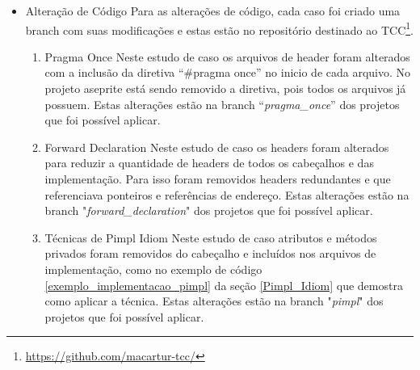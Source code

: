 \begin{itemize}
    \item Alteração de Código
    \subitem
 Para as alterações de código, cada caso foi criado
 uma branch com suas modificações e estas estão no repositório
 destinado ao TCC\footnote{\url{https://github.com/macartur-tcc/}}.
    \begin{enumerate}
        \item Pragma Once
        \subitem Neste estudo de caso os arquivos de header foram alterados
 com a inclusão da diretiva “\#pragma once” no inicio de cada arquivo.
 No projeto aseprite está sendo removido a diretiva, pois todos os arquivos já possuem.
Estas alterações estão na branch “\textit{pragma\_once}” dos projetos que foi possível aplicar.
        \item Forward Declaration
        \subitem Neste estudo de caso os headers foram alterados para reduzir
 a quantidade de headers de todos os cabeçalhos e das implementação.
 Para isso foram removidos headers redundantes e que referenciava
 ponteiros e referências de endereço.
Estas alterações estão na branch "\textit{forward\_declaration}" dos projetos que foi possível aplicar.
        \item Técnicas de Pimpl Idiom
        \subitem Neste estudo de caso atributos e métodos privados foram removidos do cabeçalho
 e incluídos nos arquivos de implementação, como no exemplo de código \ref{exemplo_implementacao_pimpl}
 da seção \ref{Pimpl_Idiom}
 que demostra como aplicar a técnica.
Estas alterações estão na branch "\textit{pimpl}" dos projetos que foi possível aplicar.
    \end{enumerate}


\end{itemize}
